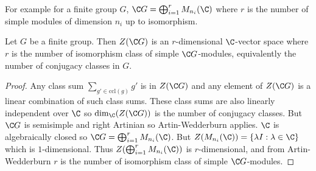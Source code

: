 \documentclass[a4paper]{article}
\begin{document}
For example for a finite group \(G\), \(\C G = \bigoplus_{i = 1}^r M_{n_i}(\C)\) where \(r\) is the number of simple modules of dimension \(n_i\) up to isomorphism.

\begin{corollary}
  Let \(G\) be a finite group. Then \(Z(\C G)\) is an \(r\)-dimensional \(\C\)-vector space where \(r\) is the number of isomorphism class of simple \(\C G\)-modules, equivalently the number of conjugacy classes in \(G\).
\end{corollary}

\begin{proof}
  Any class sum \(\sum_{g' \in \mathrm{ccl}(g)} g'\) is in \(Z(\C G)\) and any element of \(Z(\C G)\) is a linear combination of such class sums. These class sums are also linearly independent over \(\C\) so \(\dim_\C (Z(\C G))\) is the number of conjugacy classes. But \(\C G\) is semisimple and right Artinian so Artin-Wedderburn applies. \(\C\) is algebraically closed so \(\C G = \bigoplus_{i = 1}^r M_{n_i}(\C)\). But \(Z(M_{n_i}(\C)) = \{\lambda I: \lambda \in \C\}\) which is \(1\)-dimensional. Thus \(Z(\bigoplus_{i = 1}^r M_{n_i}(\C))\) is \(r\)-dimensional, and from Artin-Wedderburn \(r\) is the number of isomorphism class of simple \(\C G\)-modules.
\end{proof}
\end{document}
